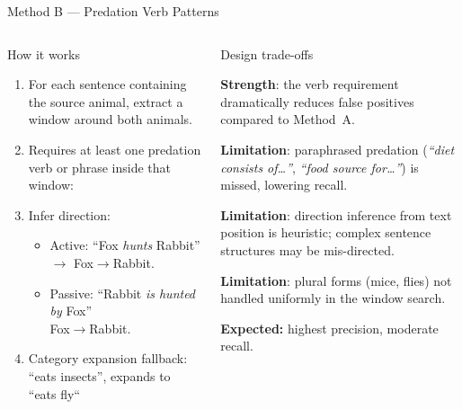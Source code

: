 \documentclass[aspectratio=169,11pt]{beamer}
\newcommand{\good}{\textcolor{td3green}{\textbf{Strength}}}
\newcommand{\bad}{\textcolor{td3red}{\textbf{Limitation}}}
\newcommand{\panelbox}[2]{%
  \begin{block}{#1}
    \raggedright
    #2
  \end{block}
}
\newenvironment{twopanelrow}{\begin{columns}[T,onlytextwidth]}{\end{columns}}
\newcommand{\twopanel}[2]{\column{0.480\textwidth}\panelbox{#1}{#2}}
\begin{document}

\begin{frame}{Method B --- Predation Verb Patterns}
  \begin{twopanelrow}
    \twopanel{How it works}{
      \small
      \begin{enumerate}
        \item For each sentence containing the source animal, extract a window around both animals.
        \item Requires at least one \alert{predation verb or phrase} inside that window:\\
            
        \item \alert{Infer direction:}
          \begin{itemize}
            \item Active: ``Fox \emph{hunts} Rabbit'' $\to$ Fox$\to$Rabbit.
            \item Passive: ``Rabbit \emph{is hunted by} Fox'' \\  Fox$\to$Rabbit.
          \end{itemize}
          \item \alert{Category expansion fallback}: ``eats insects'', expands to ``eats fly``
      \end{enumerate}
    }
    \twopanel{Design trade-offs}{
      \small
      \good: the verb requirement dramatically reduces false positives
      compared to Method~A.

      \vspace{0.5em}
      \bad: paraphrased predation (\emph{``diet consists of\ldots''},
      \emph{``food source for\ldots''}) is missed, lowering recall.

      \vspace{0.5em}
      \bad: direction inference from text position is heuristic; complex
      sentence structures may be mis-directed.

      \vspace{0.5em}
      \bad: plural forms (mice, flies) not handled uniformly in the
      window search.

      \vspace{0.5em}
      \textbf{Expected:} highest precision, moderate recall.
    }
  \end{twopanelrow}
\end{frame}
\end{document}
